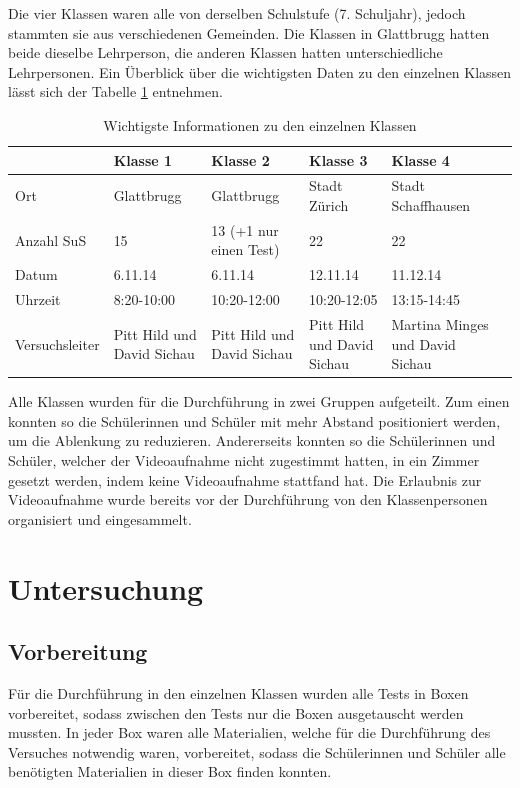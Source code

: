 Die vier Klassen waren alle von derselben Schulstufe (7. Schuljahr), jedoch stammten sie aus verschiedenen Gemeinden. Die Klassen in Glattbrugg hatten beide dieselbe Lehrperson, die anderen Klassen hatten unterschiedliche Lehrpersonen. Ein Überblick über die wichtigsten Daten zu den einzelnen Klassen lässt sich der Tabelle \ref{tab:Klassen} entnehmen. 


\begin{table}[htbp]
  \centering
  \begin{tabular}{@{}lp{2.3cm}p{3cm}p{3cm}p{3cm}p{3cm}@{}}
  \toprule
   & Klasse 1 & Klasse 2 & Klasse 3 & Klasse 4 \\ 
  \midrule
   Ort & Glattbrugg & Glattbrugg & Stadt Zürich & Stadt Schaffhausen \\ [0.2cm]
   Anzahl SuS & 15 & 13 (+1 nur einen Test) & 22 & 22 \\ [0.2cm]
   Datum  & 6.11.14 & 6.11.14 & 12.11.14 & 11.12.14\\ [0.3cm]
   Uhrzeit & 8:20-10:00 & 10:20-12:00& 10:20-12:05 & 13:15-14:45 \\ [0.3cm]
   Versuchsleiter & Pitt Hild und David Sichau   & Pitt Hild und David Sichau  & Pitt Hild und David Sichau  & Martina Minges und David Sichau \\
  \bottomrule
  \end{tabular} 
  \caption{Wichtigste Informationen zu den einzelnen Klassen}
  \label{tab:Klassen}
\end{table}

Alle Klassen wurden für die Durchführung in zwei Gruppen aufgeteilt. Zum einen konnten so die Schülerinnen und Schüler mit mehr Abstand positioniert werden, um die Ablenkung zu reduzieren. Andererseits konnten so die Schülerinnen und Schüler, welcher der Videoaufnahme nicht zugestimmt hatten, in ein Zimmer gesetzt werden, indem keine Videoaufnahme stattfand hat. Die Erlaubnis zur Videoaufnahme wurde bereits vor der Durchführung von den Klassenpersonen organisiert und eingesammelt.



\section{Untersuchung}

\subsection{Vorbereitung}
Für die Durchführung in den einzelnen Klassen wurden alle Tests in Boxen vorbereitet, sodass zwischen den Tests nur die Boxen ausgetauscht werden mussten. In jeder Box waren alle Materialien, welche für die Durchführung des Versuches notwendig waren, vorbereitet, sodass die Schülerinnen und Schüler alle benötigten Materialien in dieser Box finden konnten.  

